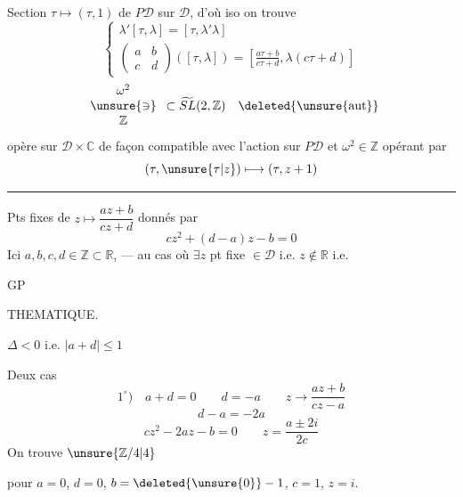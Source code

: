 Section $\tau\longmapsto(\tau,1)$ de $P\mathcal D$ sur $\mathcal D$, d'où iso
on trouve
\[
\left\{\begin{gathered}
\lambda'[\tau,\lambda]=[\tau,\lambda'\lambda]\\
\begin{pmatrix}a&b\\c&d\end{pmatrix}([\tau,\lambda])=\left[\frac{a\tau+b}{c\tau+d},\lambda(c\tau+d)\right]
\end{gathered}\right.
\]
\[
\begin{array}{c}\omega^2\\\unsure{\ni}\\\mathbb Z\end{array}\subset\widetilde{SL}(2,\mathbb Z)\quad\deleted{\unsure{\text{aut}}}
\]
opère sur $\mathcal D\times\mathbb C$ de façon compatible avec l'action sur $P\mathcal D$ et $\omega^2\in\mathbb Z$ opérant par
\[(\tau,\unsure{\tau|z})\longmapsto(\tau,z+1)\]
\rule{\linewidth}{.4pt}

Pts fixes de $z\longmapsto\dfrac{az+b}{cz+d}$ donnés par
\[cz^2+(d-a)z-b=0\]
Ici $a,b,c,d\in\mathbb Z\subset\mathbb R$, ---  \deleted{$\Delta\Leftarrow$} au cas où $\exists z$ pt fixe $\in\mathcal D$ i.e. $z\notin\mathbb R$ i.e.

GP

THEMATIQUE.

\quad$\Delta<0$ i.e. $|a+d|\leq1$

Deux cas\quad{}
\[
1^\circ)\quad a+d=0\qquad d=-a\qquad z\longrightarrow\frac{az+b}{cz-a}
\]
\[d-a=-2a\]
\[
cz^2-2az-b=0\qquad z=\frac{a\pm2i}{2c}
\]
On trouve \textcircled{$\unsure{\mathbb Z/4|4}$}

pour $a=0$,  $d=0$, $b=\deleted{\unsure{0}}-1$, $c=1$, $z=i$.

